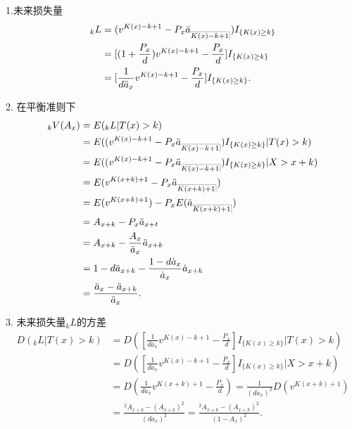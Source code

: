 \documentclass[a4paper,10pt]{ctexbook}
\makeatletter
\DeclareRobustCommand{\annu}[1]{_{%
    \def\arraystretch{0}%
    \setlength\arraycolsep{1pt}%
    \setlength\arrayrulewidth{.2pt}%
    \begin{array}[b]{@{}c|}\hline
        \\[\arraycolsep]%
        \scriptstyle #1%
    \end{array}%
}}
\makeatother
\begin{document}
1.未来损失量
\begin{align*}
    {}_kL & =(v^{K(x)-k+1}-P_x \ddot a_{\annu {K(x)-k+1}})I_{\{K(x)\ge k\}}      \\
          & =[(1+\frac{P_x }{d})v^{K(x)-k+1}-\frac{P_x}{d}] I_{\{K(x)\ge k\}}    \\
          & =[\frac{1}{d\ddot a_x}v^{K(x)-k+1}-\frac{P_x }{d}]I_{\{K(x)\ge k\}}. \\
\end{align*}

2. 在平衡准则下
\begin{align*}
    {}_kV(A_x) & =E({}_kL|T(x)>k)                                                          \\
               & =E((v^{K(x)-k+1}-P_x \ddot a_{\annu {K(x)-k+1}})I_{\{K(x)\ge k\}}|T(x)>k) \\
               & =E((v^{K(x)-k+1}-P_x \ddot a_{\annu {K(x)-k+1}})I_{\{K(x)\ge k\}}|X>x+k)  \\
               & =E(v^{K(x+k)+1}-P_x \ddot a_{\annu {K(x+k)+1}})                           \\
               & =E(v^{K(x+k)+1})-P_x E(\ddot a_{\annu {K(x+k)+1}})                        \\
               & = A_{x+k}-P_x\ddot a_{x+t}                                                \\
               & = A_{x+k}-\frac{ A_x}{\ddot a_x}\ddot a_{x+k}                             \\
               & =1-d\ddot a_{x+k}-\frac{1-d \dot a_x}{\dot a_x}\dot a_{x+k}               \\
               & =\frac{\ddot a_x-\ddot a_{x+k}}{\ddot a_x}.
\end{align*}

3. 未来损失量$_kL$的方差
\begin{align*}
    D(_kL|T(x)>k) & =D([\frac{1}{d\ddot a_x}v^{K(x)-k+1}-\frac{P_x }{d}]I_{\{K(x)\ge k\}}|T(x)>k)                  \\
                  & =D([\frac{1}{d\ddot a_x}v^{K(x)-k+1}-\frac{P_x }{d}]I_{\{K(x)\ge k\}}|X>x+k)                   \\
                  & =D(\frac{1}{d\ddot a_x}v^{K(x+k)+1}-\frac{P_x }{d})
    =\frac{1}{(d\ddot a_x)^2}D(v^{K(x+k)+1})                                                                       \\
                  & =\frac{{}^2 A_{x+k}-( A_{x+k})^2}{(d\ddot a_x)^2}=\frac{{}^2 A_{x+k}-( A_{x+k})^2}{(1-A_x)^2}. \\\end{align*}
\end{document}
